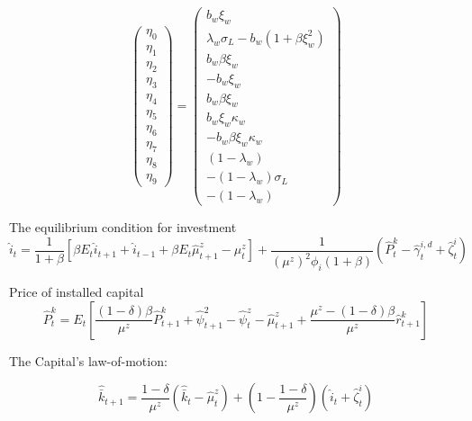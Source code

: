 \documentclass[12pt,oneside,a4paper]{article}
\begin{document}
$$
\left(\begin{array}{c}
\eta_{0} \\
\eta_{1} \\
\eta_{2} \\
\eta_{3} \\
\eta_{4} \\
\eta_{5} \\
\eta_{6} \\
\eta_{7} \\
\eta_{8} \\
\eta_{9}
\end{array}\right)=\left(\begin{array}{c}
b_{w} \xi_{w} \\
\lambda_{w} \sigma_{L}-b_{w}\left(1+\beta \xi_{w}^{2} \right) \\
b_{w} \beta \xi_{w} \\
-b_{w} \xi_{w} \\
b_{w} \beta \xi_{w} \\
b_{w} \xi_{w} \kappa_{w} \\
-b_{w} \beta \xi_{w} \kappa_{w} \\
\left(1-\lambda_{w}\right) \\
-\left(1-\lambda_{w}\right) \sigma_{L} \\
-\left(1-\lambda_{w}\right)
\end{array}\right)
$$

The equilibrium condition for investment
\begin{equation}
    \hat{i}_{t}=\frac{1}{1+\beta}\left[\beta E_{t} \hat{i}_{t+1}+\hat{i}_{t-1}+\beta E_{t} \hat{\mu}_{t+1}^{z}-\mu_{t}^{z}\right]+\frac{1}{\left(\mu^{z}\right)^{2} \phi_{i}(1+\beta)}\left(\hat{P}_{t}^{k}-\hat{\gamma}_{t}^{i, d}+\hat{\zeta}_{t}^{i}\right)
\end{equation}

Price of installed capital
\begin{equation}
    \hat{P}_{t}^{k}=E_{t}\left[\frac{(1-\delta) \beta}{\mu^{z}} \hat{P}_{t+1}^{k}+\hat{\psi}_{t+1}^{2}-\hat{\psi}_{t}^{z}-\hat{\mu}_{t+1}^{z}+\frac{\mu^{z}-(1-\delta) \beta}{\mu^{z}} \hat{r}_{t+1}^{k}\right]
\end{equation}

The Capital’s law-of-motion:

\begin{equation}
    \hat{\bar{k}}_{t+1}=\frac{1-\delta}{\mu^{z}}\left(\hat{\bar{k}}_{t}-\hat{\mu}_{t}^{z}\right)+\left(1-\frac{1-\delta}{\mu^{z}}\right)\left(\hat{i}_{t}+\hat{\zeta}_{t}^{i}\right)
\end{equation}
\end{document}
